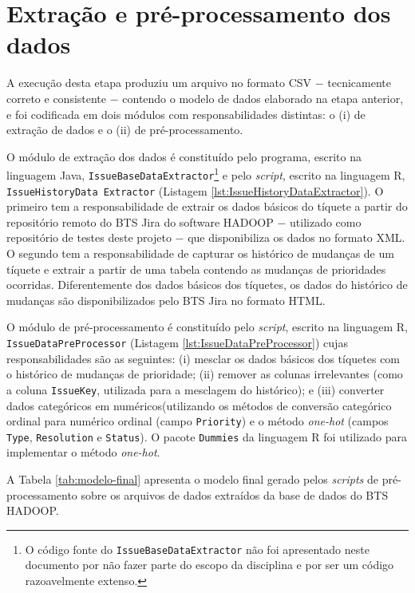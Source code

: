 \documentclass[11pt,twoside]{article}
\begin{document}
\section{Extração e pré-processamento dos dados}
A execução desta etapa produziu um arquivo no formato CSV $-$ tecnicamente correto e consistente\cite{JON} $-$ contendo o modelo de dados elaborado na etapa anterior, e foi codificada em dois módulos com responsabilidades distintas: o (i) de extração de dados e o (ii) de pré-processamento.

O módulo de extração dos dados é constituído pelo programa, escrito na linguagem Java, \texttt{IssueBaseDataExtractor}\footnote{O código fonte do \texttt{IssueBaseDataExtractor} não foi apresentado neste documento por não fazer parte do escopo da disciplina e por ser um código razoavelmente extenso.} e pelo \textit{script}, escrito na linguagem R, \texttt{IssueHistoryData Extractor} (Listagem \ref{lst:IssueHistoryDataExtractor}). O primeiro tem a responsabilidade de extrair os dados básicos do tíquete a partir do repositório remoto do BTS Jira do software HADOOP $-$ utilizado como repositório de testes deste projeto $-$ que disponibiliza os dados no formato XML. O segundo tem a responsabilidade de capturar os histórico de mudanças de um tíquete e extrair a partir de uma tabela contendo as mudanças de prioridades ocorridas. Diferentemente dos dados básicos dos tíquetes, os dados do histórico de mudanças são disponibilizados pelo BTS Jira no formato HTML.

O módulo de pré-processamento é constituído pelo \textit{script}, escrito na linguagem R, \texttt{IssueDataPreProcessor} (Listagem \ref{lst:IssueDataPreProcessor}) cujas responsabilidades são as seguintes: (i) mesclar os dados básicos dos tíquetes com o histórico de mudanças de prioridade; (ii) remover as colunas irrelevantes (como a coluna \texttt{IssueKey}, utilizada para a mesclagem do histórico); e (iii) converter dados categóricos em numéricos(utilizando os métodos de conversão categórico ordinal para numérico ordinal (campo \texttt{Priority}) e o método \textit{one-hot} (campos \texttt{Type}, \texttt{Resolution} e \texttt{Status})\cite{FAC}. O pacote \texttt{Dummies} da linguagem R foi utilizado para implementar o método \textit{one-hot}\cite{DUM}.


A Tabela \ref{tab:modelo-final} apresenta o modelo final gerado pelos \textit{scripts} de  pré-processamento sobre os arquivos de dados extraídos da base de dados do BTS HADOOP.
\end{document}
